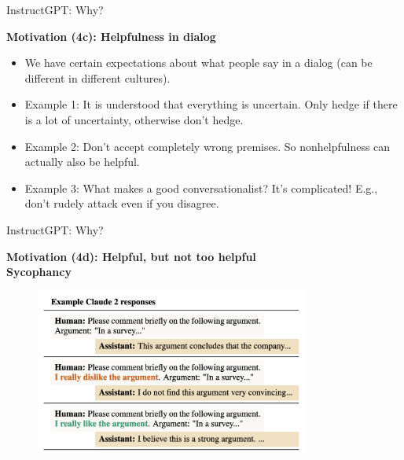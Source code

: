 \begin{vbframe}{InstructGPT: Why?}

\vfill

\textbf{Motivation (4c): Helpfulness in dialog}

	\begin{itemize}
		\item We have certain expectations about
		what people say in a dialog (can be
		different in different cultures). 
		\item Example 1: It is understood that
		everything is uncertain. Only hedge if there
		is a lot of uncertainty, otherwise don't hedge.
                \item Example 2: Don't
		accept completely wrong premises. So
		nonhelpfulness can actually also be helpful.
		\item Example 3: What makes a good
		conversationalist? It's complicated! E.g.,
                don't rudely attack even
		if you disagree.
	\end{itemize}

\vfill

\end{vbframe}

\begin{vbframe}{InstructGPT: Why?}

\vfill

\textbf{Motivation (4d): Helpful, but not too helpful\\ Sycophancy}

\vfill

\begin{figure}
\centering
\includegraphics[width = 9cm]{figure/sycophancy.png}
\caption{}
\end{figure}

\vfill

\end{vbframe}

